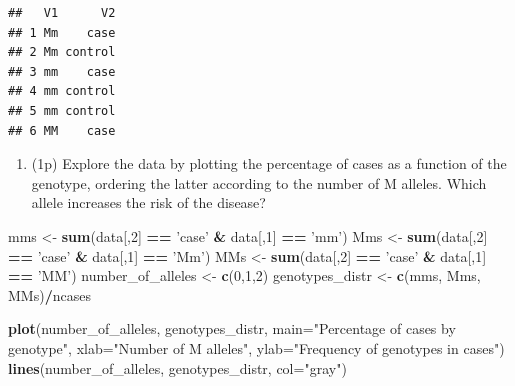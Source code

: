 \documentclass[
]{article}
\newenvironment{Shaded}{\begin{snugshade}}{\end{snugshade}}
\newcommand{\DataTypeTok}[1]{\textcolor[rgb]{0.13,0.29,0.53}{#1}}
\newcommand{\DecValTok}[1]{\textcolor[rgb]{0.00,0.00,0.81}{#1}}
\newcommand{\KeywordTok}[1]{\textcolor[rgb]{0.13,0.29,0.53}{\textbf{#1}}}
\newcommand{\NormalTok}[1]{#1}
\newcommand{\OperatorTok}[1]{\textcolor[rgb]{0.81,0.36,0.00}{\textbf{#1}}}
\newcommand{\StringTok}[1]{\textcolor[rgb]{0.31,0.60,0.02}{#1}}
\providecommand{\tightlist}{%
  \setlength{\itemsep}{0pt}\setlength{\parskip}{0pt}}
\begin{document}
\begin{verbatim}
##   V1      V2
## 1 Mm    case
## 2 Mm control
## 3 mm    case
## 4 mm control
## 5 mm control
## 6 MM    case
\end{verbatim}

\begin{enumerate}
\def\labelenumi{\arabic{enumi}.}
\setcounter{enumi}{1}
\tightlist
\item
  (1p) Explore the data by plotting the percentage of cases as a
  function of the genotype, ordering the latter according to the number
  of M alleles. Which allele increases the risk of the disease?
\end{enumerate}

\begin{Shaded}
\begin{Highlighting}[]
\NormalTok{mms <-}\StringTok{ }\KeywordTok{sum}\NormalTok{(data[,}\DecValTok{2}\NormalTok{] }\OperatorTok{==}\StringTok{ 'case'} \OperatorTok{&}\StringTok{ }\NormalTok{data[,}\DecValTok{1}\NormalTok{] }\OperatorTok{==}\StringTok{ 'mm'}\NormalTok{)}
\NormalTok{Mms <-}\StringTok{ }\KeywordTok{sum}\NormalTok{(data[,}\DecValTok{2}\NormalTok{] }\OperatorTok{==}\StringTok{ 'case'} \OperatorTok{&}\StringTok{ }\NormalTok{data[,}\DecValTok{1}\NormalTok{] }\OperatorTok{==}\StringTok{ 'Mm'}\NormalTok{)}
\NormalTok{MMs <-}\StringTok{ }\KeywordTok{sum}\NormalTok{(data[,}\DecValTok{2}\NormalTok{] }\OperatorTok{==}\StringTok{ 'case'} \OperatorTok{&}\StringTok{ }\NormalTok{data[,}\DecValTok{1}\NormalTok{] }\OperatorTok{==}\StringTok{ 'MM'}\NormalTok{)}
\NormalTok{number_of_alleles <-}\StringTok{ }\KeywordTok{c}\NormalTok{(}\DecValTok{0}\NormalTok{,}\DecValTok{1}\NormalTok{,}\DecValTok{2}\NormalTok{)}
\NormalTok{genotypes_distr <-}\StringTok{ }\KeywordTok{c}\NormalTok{(mms, Mms, MMs)}\OperatorTok{/}\NormalTok{ncases}

\KeywordTok{plot}\NormalTok{(number_of_alleles, genotypes_distr, }\DataTypeTok{main=}\StringTok{"Percentage of cases by genotype"}\NormalTok{, }\DataTypeTok{xlab=}\StringTok{"Number of M alleles"}\NormalTok{, }\DataTypeTok{ylab=}\StringTok{"Frequency of genotypes in cases"}\NormalTok{)}
\KeywordTok{lines}\NormalTok{(number_of_alleles, genotypes_distr, }\DataTypeTok{col=}\StringTok{"gray"}\NormalTok{)}
\end{Highlighting}
\end{Shaded}
\end{document}
